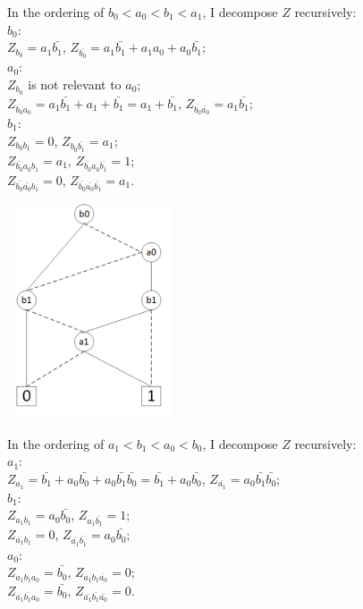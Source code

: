 \documentclass[12pt]{article}
\begin{document}
    \noindent
    In the ordering of $b_{0} < a_{0} < b_{1} < a_{1}$,
    I decompose $Z$ recursively:\\
    $b_{0}$:\\
    $Z_{b_{0}} = a_{1}\bar{b_{1}}$, $Z_{\bar{b_{0}}} = a_{1}\bar{b_{1}} + a_{1}a_{0} + a_{0}\bar{b_{1}}$;\\
    $a_{0}$:\\
    $Z_{b_{0}}$ is not relevant to $a_{0}$;\\
    $Z_{\bar{b_{0}}a_{0}} = a_{1}\bar{b_{1}} + a_{1} + \bar{b_{1}} = a_{1} + \bar{b_{1}} $,
    $Z_{\bar{b_{0}}\bar{a_{0}}} = a_{1}\bar{b_{1}}$;\\
    $b_{1}$:\\
    $Z_{b_{0}b_{1}} = 0$, $Z_{b_{0}\bar{b_{1}}} = a_{1}$;\\
    $Z_{\bar{b_{0}}a_{0}b_{1}} = a_{1}$,
    $Z_{\bar{b_{0}}a_{0}\bar{b_{1}}} = 1$;\\
    $Z_{\bar{b_{0}}\bar{a_{0}}b_{1}} = 0$,
    $Z_{\bar{b_{0}}\bar{a_{0}}\bar{b_{1}}} = a_{1}$.\\

    \begin{center}
        \includegraphics[width = 2.00in, height = 2.50in]{figure4.png}
    \end{center}

    \noindent
    In the ordering of $a_{1} < b_{1} < a_{0} < b_{0}$,
    I decompose $Z$ recursively:\\
    $a_{1}$:\\
    $Z_{a_{1}} = \bar{b_{1}} + a_{0}\bar{b_{0}} + a_{0}\bar{b_{1}}\bar{b_{0}} = \bar{b_{1}} + a_{0}\bar{b_{0}}$,
    $Z_{\bar{a_{1}}} = a_{0}\bar{b_{1}}\bar{b_{0}}$;\\
    $b_{1}$:\\
    $Z_{a_{1}b_{1}} = a_{0}\bar{b_{0}}$,
    $Z_{a_{1}\bar{b_{1}}} = 1$;\\
    $Z_{\bar{a_{1}}b_{1}} = 0$,
    $Z_{\bar{a_{1}}\bar{b_{1}}} = a_{0}\bar{b_{0}}$;\\
    $a_{0}$:\\
    $Z_{a_{1}b_{1}a_{0}} = \bar{b_{0}}$,
    $Z_{a_{1}b_{1}\bar{a_{0}}} = 0$;\\
    $Z_{\bar{a_{1}}\bar{b_{1}}a_{0}} = \bar{b_{0}}$,
    $Z_{\bar{a_{1}}\bar{b_{1}}\bar{a_{0}}} = 0$.\\
\end{document}
